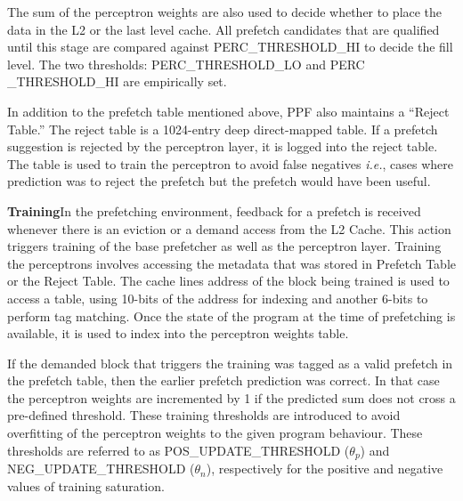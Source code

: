 The sum of the perceptron weights are also used to decide whether to
place the data in the L2 or the last level cache.  All prefetch
candidates that are qualified until this stage are compared against
PERC\_THRESHOLD\_HI to decide the fill level. The two thresholds:
PERC\_THRESHOLD\_LO and PERC \_THRESHOLD\_HI are empirically set.


In addition to the prefetch table mentioned above, PPF also maintains
a ``Reject Table.''  The reject table is a 1024-entry deep
direct-mapped table.  If a prefetch suggestion is rejected by the
perceptron layer, it is logged into the reject table.  The table is
used to train the perceptron to %
avoid false negatives \textit{i.e.}, cases where prediction was to
reject the prefetch but the prefetch would have been useful.



\textbf{Training}\newline In the prefetching environment, feedback for
a prefetch is received whenever there is an eviction or a demand
access from the L2 Cache.  This action triggers training of the base
prefetcher as well as the perceptron layer.  Training the perceptrons
involves accessing the metadata that was stored in Prefetch Table or
the Reject Table.  The cache lines address of the block being trained
is used to access a table, using 10-bits of the address for indexing
and another 6-bits to perform tag matching.  Once the state of the
program at the time of prefetching is available, it is
used to index into the perceptron weights table.

If the demanded block that triggers the training was tagged as a valid
prefetch in the prefetch table, then the earlier prefetch prediction
was correct.  In that case the perceptron weights are incremented by 1
if the predicted sum does not cross a pre-defined threshold. These
training thresholds are introduced to avoid overfitting of the
perceptron weights to the given program behaviour. These thresholds
are referred to as POS\_UPDATE\_THRESHOLD ($\theta_p$) and
NEG\_UPDATE\_THRESHOLD ($\theta_n$), respectively for the positive and
negative values of training saturation.

